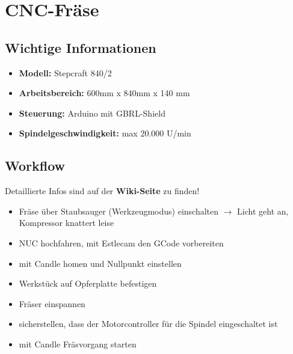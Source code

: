\documentclass{article}
\begin{document}
	
	\noindent
	\begin{minipage}{0.25\textwidth}
		\section*{CNC-Fräse}
	\end{minipage}
	\begin{minipage}{0.75\textwidth}
		\begin{flushright}
			
		\end{flushright}	
	\end{minipage}%
	
	\subsection*{Wichtige Informationen}
	\begin{itemize}
		\item \textbf{Modell:} Stepcraft 840/2
		\item \textbf{Arbeitsbereich:} 600mm x 840mm x 140 mm
		\item \textbf{Steuerung:} Arduino mit GBRL-Shield
		\item \textbf{Spindelgeschwindigkeit:} max 20.000 U/min
	\end{itemize}
	
	\subsection*{Workflow}
	Detaillierte Infos sind auf der\textbf{ Wiki-Seite} zu finden!
	\begin{itemize}
		\item Fräse über Staubsauger (Werkzeugmodus) einschalten $\rightarrow$ Licht geht an, Kompressor knattert leise
		\item NUC hochfahren, mit Estlecam den GCode vorbereiten
		\item mit Candle homen und Nullpunkt einstellen
		\item Werkstück auf Opferplatte befestigen
		\item Fräser einspannen
		\item sicherstellen, dass der Motorcontroller für die Spindel eingeschaltet ist
		\item mit Candle Fräsvorgang starten
	\end{itemize}
	
\end{document}
